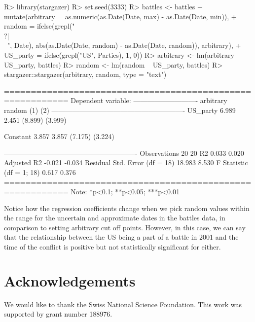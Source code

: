 \documentclass[
]{jss}
\begin{document}
\begin{CodeChunk}
\begin{CodeInput}
R> library(stargazer)
R> set.seed(3333)
R> battles <- battles %
+   mutate(arbitrary = as.numeric(as.Date(Date, max) - as.Date(Date, min)),
+          random = ifelse(grepl("\\?|\\~", Date), abs(as.Date(Date, random) - as.Date(Date, random)), arbitrary),
+          US_party = ifelse(grepl("US", Parties), 1, 0))
R> arbitrary <- lm(arbitrary ~ US_party, battles)
R> random <- lm(random ~ US_party, battles)
R> stargazer::stargazer(arbitrary, random, type = "text")
\end{CodeInput}
\begin{CodeOutput}

==========================================================
                                  Dependent variable:     
                              ----------------------------
                                 arbitrary       random   
                                    (1)           (2)     
----------------------------------------------------------
US_party                           6.989         2.451    
                                  (8.899)       (3.999)   
                                                          
Constant                           3.857         3.857    
                                  (7.175)       (3.224)   
                                                          
----------------------------------------------------------
Observations                        20             20     
R2                                 0.033         0.020    
Adjusted R2                       -0.021         -0.034   
Residual Std. Error (df = 18)     18.983         8.530    
F Statistic (df = 1; 18)           0.617         0.376    
==========================================================
Note:                          *p<0.1; **p<0.05; ***p<0.01
\end{CodeOutput}
\end{CodeChunk}

Notice how the regression coefficients change when we pick random values
within the range for the uncertain and approximate dates in the battles
data, in comparison to setting arbitrary cut off points. However, in
this case, we can say that the relationship between the US being a part
of a battle in 2001 and the time of the conflict is positive but not
statistically significant for either.

\hypertarget{acknowledgements}{%
\section{Acknowledgements}\label{acknowledgements}}

We would like to thank the Swiss National Science Foundation. This work
was supported by grant number 188976.

\renewcommand\refname{References}

\end{document}
